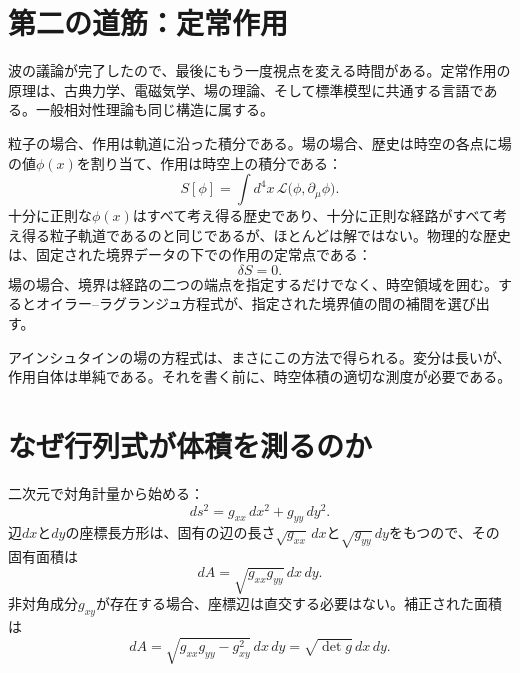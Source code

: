\begin{classroomqa}
\end{classroomqa}

\section{第二の道筋：定常作用}

波の議論が完了したので、最後にもう一度視点を変える時間がある。定常作用の原理は、古典力学、電磁気学、場の理論、そして標準模型に共通する言語である。一般相対性理論も同じ構造に属する。

粒子の場合、作用は軌道に沿った積分である。場の場合、歴史は時空の各点に場の値\(\phi(x)\)を割り当て、作用は時空上の積分である：
\begin{equation}
 S[\phi]
 =\int d^4x\,
 \mathcal L\bigl(\phi,\partial_\mu\phi\bigr).
 \label{eq:field-action}
\end{equation}
十分に正則な\(\phi(x)\)はすべて考え得る歴史であり、十分に正則な経路がすべて考え得る粒子軌道であるのと同じであるが、ほとんどは解ではない。物理的な歴史は、固定された境界データの下での作用の定常点である：
\begin{equation}
 \delta S=0.
 \label{eq:stationary-action}
\end{equation}
場の場合、境界は経路の二つの端点を指定するだけでなく、時空領域を囲む。するとオイラー--ラグランジュ方程式が、指定された境界値の間の補間を選び出す。

アインシュタインの場の方程式は、まさにこの方法で得られる。変分は長いが、作用自体は単純である。それを書く前に、時空体積の適切な測度が必要である。

\section{なぜ行列式が体積を測るのか}

二次元で対角計量から始める：
\begin{equation}
 ds^2=g_{xx}\,dx^2+g_{yy}\,dy^2.
\end{equation}
辺\(dx\)と\(dy\)の座標長方形は、固有の辺の長さ\(\sqrt{g_{xx}}\,dx\)と\(\sqrt{g_{yy}}\,dy\)をもつので、その固有面積は
\begin{equation}
 dA
 =\sqrt{g_{xx}g_{yy}}\,dx\,dy.
\end{equation}
非対角成分\(g_{xy}\)が存在する場合、座標辺は直交する必要はない。補正された面積は
\begin{equation}
 dA
 =\sqrt{g_{xx}g_{yy}-g_{xy}^2}\,dx\,dy
 =\sqrt{\det g}\,dx\,dy.
 \label{eq:area-determinant}
\end{equation}

